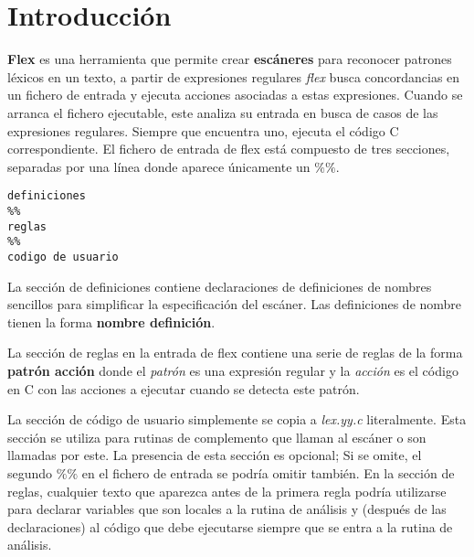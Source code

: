\section{Introducción}

\textbf{Flex} es una herramienta que permite crear \textbf{escáneres} para reconocer patrones léxicos en un texto, a partir de expresiones regulares \textit{flex} busca concordancias en un fichero de entrada y ejecuta acciones asociadas a estas expresiones. Cuando se arranca el fichero ejecutable, este analiza su entrada en busca de casos de las expresiones regulares. Siempre que encuentra uno, ejecuta el código C correspondiente. El fichero de entrada de flex está compuesto de tres secciones, separadas por una línea donde aparece únicamente un $\%\%$.

\begin{lstlisting}
definiciones
%%
reglas
%%
codigo de usuario
\end{lstlisting}

La sección de definiciones contiene declaraciones de definiciones de nombres sencillos para simplificar la especificación del escáner. Las definiciones de nombre tienen la forma \textbf{nombre definición}.

La sección de reglas en la entrada de flex contiene una serie de reglas de la forma \textbf{patrón acción} donde el \textit{patrón} es una expresión regular y la \textit{acción} es el código en C con las acciones a ejecutar cuando se detecta este patrón.

La sección de código de usuario simplemente se copia a \textit{lex.yy.c} literalmente. Esta sección se utiliza para rutinas de complemento que llaman al escáner o son llamadas por este. La presencia de esta sección es opcional; Si se omite, el segundo $\%\%$ en el fichero de entrada se podría omitir también. En la sección de reglas, cualquier texto que aparezca antes de la primera regla podría utilizarse para declarar variables que son locales a la rutina de análisis y (después de las declaraciones) al código que debe ejecutarse siempre que se entra a la rutina de análisis.

\pagebreak